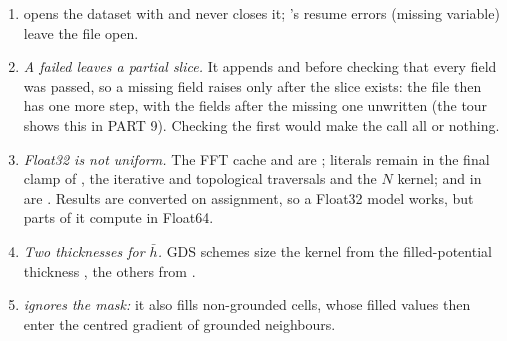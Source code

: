 \begin{enumerate}[leftmargin=1.5em]
  's callers would make the model return $N = 0$ cleanly.
\item \emph{} opens the dataset with  and never closes it; 's resume errors
  (missing variable) leave the file open.
\item \emph{A failed  leaves a partial slice.} It appends  and  before checking that every
  field was passed, so a missing field raises only after the slice exists: the file then has one more step, with the fields
  after the missing one unwritten (the tour shows this in PART 9). Checking the  first would make the call
  all or nothing.
\item \emph{Float32 is not uniform.} The FFT cache and  are ;  literals remain in
  the final clamp of , the iterative and topological traversals and the $N$ kernel;  and
   in  are . Results are converted on assignment, so a Float32 model works, but parts of it
  compute in Float64.
\item \emph{Two thicknesses for $\bar h$.} GDS schemes size the kernel from the filled-potential thickness , the others
  from .
\item \emph{ ignores the mask:} it also fills non-grounded cells, whose filled values then enter the centred gradient of
  grounded neighbours.
\end{enumerate}
